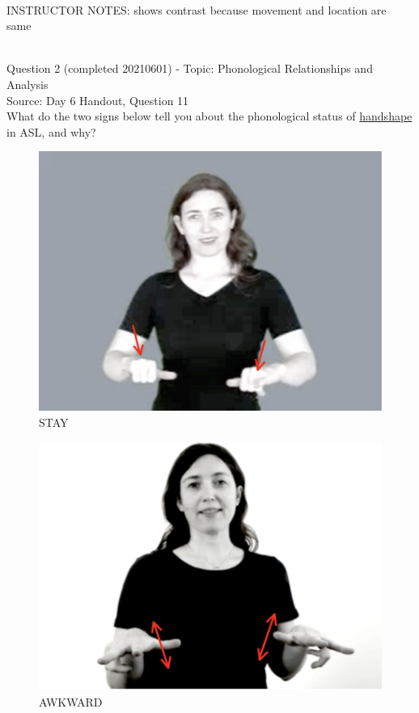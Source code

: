 \documentclass[12pt]{article}
\begin{document}
~\\
INSTRUCTOR NOTES: shows contrast because movement and location are same


~\\

{\large Question 2} (completed 20210601) - Topic: Phonological Relationships and Analysis\\
Source: Day 6 Handout, Question 11\\

What do the two signs below tell you about the phonological status of \underline{handshape} in ASL, and why?\\

\begin{figure}[H]
\includegraphics{../images/asl_stay.png}
\caption{STAY}
\end{figure}
\begin{figure}[H]
\includegraphics{../images/asl_awkward.png}
\caption{AWKWARD}
\end{figure}
\end{document}
